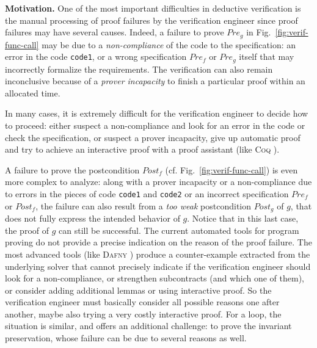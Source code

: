 \documentclass[web]{frama-c-book}
\begin{document}
\textbf{Motivation.} 
One of the most important difficulties in deductive verification is the manual
processing of proof failures 
by the verification engineer since proof failures may have several
causes. 
Indeed, a failure to prove $\textit{Pre}_g$ in Fig.~\ref{fig:verif-func-call} may be due to
a \emph{non-compliance} of the code to the specification:
an error in the code \lstinline'code1', or a 
wrong specification $\textit{Pre}_f$ or $\textit{Pre}_g$ itself
that may incorrectly formalize the requirements.
The verification can also remain inconclusive because of 
a \emph{prover incapacity} to finish
a particular proof within an allocated time. 

In many cases, it is extremely difficult for the verification engineer 
to decide how to proceed: 
either suspect a non-compliance and look for an error in the code or check the specification, 
or suspect a prover incapacity, give up automatic proof and try to achieve an
interactive proof with a proof assistant (like \textsc{Coq} \cite{coq}).

A failure to prove the postcondition $\textit{Post}_f$ %
(cf. Fig.~\ref{fig:verif-func-call}) is even more complex to analyze: along with a
prover incapacity or a non-compliance due to errors in the pieces of code
\lstinline'code1' and \lstinline'code2' or an incorrect
specification $\textit{Pre}_f$ or $\textit{Post}_f$, the failure can
also result from a \textit{too weak} postcondition $\textit{Post}_g$ of $g$, that
does not fully express the intended behavior of $g$. Notice that in this last case, the proof of $g$ can
still be successful. 
The current automated tools for program proving
do not provide a precise 
indication on the reason of the proof failure.
The most advanced tools (like \textsc{Dafny} \cite{Leino/FIDE14}) produce a
counter-example extracted from the underlying solver
that cannot precisely indicate if the verification engineer should look for 
a non-compliance,
or strengthen subcontracts (and which one of them), 
or consider adding additional lemmas or using interactive proof.
So the verification engineer must basically consider all possible reasons one
after another, maybe also trying a very costly interactive proof.
For a loop, %
the situation is similar,
and offers an additional challenge:
to prove the invariant preservation, whose failure 
can be due to several reasons as well.
\end{document}

